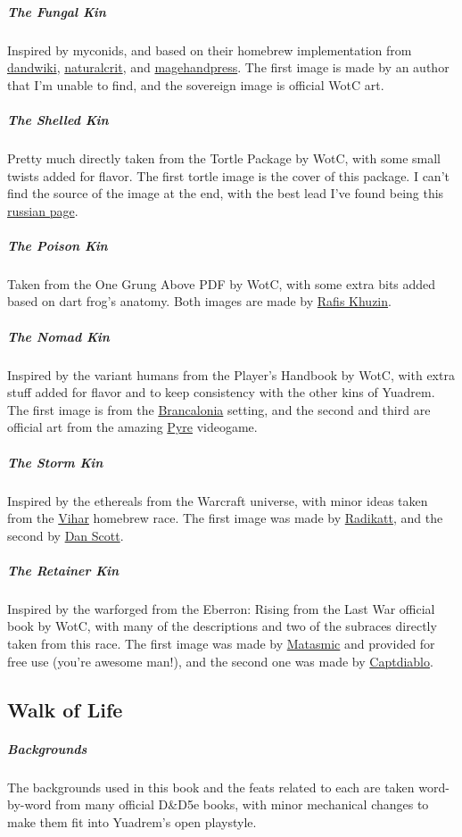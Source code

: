     \subparagraph{The Fungal Kin} Inspired by myconids, and based on their homebrew implementation from \href{https://www.dandwiki.com/wiki/Myconid_(5e_Race)}{dandwiki}, \href{https://www.reddit.com/r/UnearthedArcana/comments/5269hx/race_myconid/}{naturalcrit}, and \href{https://mfov.magehandpress.com/2015/09/myconids.html}{magehandpress}.
    The first image is made by an author that I'm unable to find, and the sovereign image is official WotC art.

    \subparagraph{The Shelled Kin} Pretty much directly taken from the Tortle Package by WotC, with some small twists added for flavor.
    The first tortle image is the cover of this package.
    I can't find the source of the image at the end, with the best lead I've found being this \href{https://avatarko.ru/kartinka/30751}{russian page}.

    \subparagraph{The Poison Kin} Taken from the One Grung Above PDF by WotC, with some extra bits added based on dart frog's anatomy.
    Both images are made by \href{https://www.artstation.com/rafis}{Rafis Khuzin}.

    \subparagraph{The Nomad Kin} Inspired by the variant humans from the Player's Handbook by WotC, with extra stuff added for flavor and to keep consistency with the other kins of Yuadrem.
    The first image is from the \href{https://www.kickstarter.com/projects/acherongames/brancalonia-the-spaghetti-fantasy-rpg?lang=es}{Brancalonia} setting, and the second and third are official art from the amazing \href{https://www.supergiantgames.com/games/pyre/}{Pyre} videogame.

    \subparagraph{The Storm Kin} Inspired by the ethereals from the Warcraft universe, with minor ideas taken from the \href{https://www.dandwiki.com/wiki/Vihar_(5e_Race)}{Vihar} homebrew race.
    The first image was made by \href{https://radikatt.tumblr.com/}{Radikatt}, and the second by \href{https://twitter.com/danscottart}{Dan Scott}.

    \subparagraph{The Retainer Kin} Inspired by the warforged from the Eberron: Rising from the Last War official book by WotC, with many of the descriptions and two of the subraces directly taken from this race.
    The first image was made by \href{https://www.reddit.com/user/Matasmic/}{Matasmic} and provided for free use (you're awesome man!), and the second one was made by \href{https://www.reddit.com/user/captdiablo/}{Captdiablo}.

\subsection*{Walk of Life}
    \subparagraph{Backgrounds} The backgrounds used in this book and the feats related to each are taken word-by-word from many official D\&D5e books, with minor mechanical changes to make them fit into Yuadrem's open playstyle.

